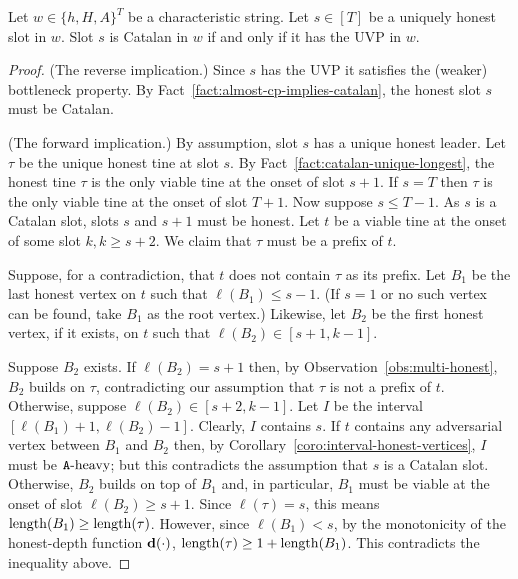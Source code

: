   \begin{theorem}\label{thm:unique-honest}
    Let $w \in \{h,H,A\}^T$ be a characteristic string. 
    Let $s \in [T]$ be a uniquely honest slot in $w$. 
    Slot $s$ is Catalan in $w$ 
    if and only if 
    it has the UVP in $w$. 
  \end{theorem}

  \begin{proof}
    (The reverse implication.) 
    Since $s$ has the UVP  
    it satisfies the (weaker) bottleneck property. 
    By Fact~\ref{fact:almost-cp-implies-catalan}, 
    the honest slot $s$ must be Catalan. 

    (The forward implication.) 
    By assumption, slot $s$ has a unique honest leader. 
    Let $\tau$ be the unique honest tine at slot $s$.
    By Fact~\ref{fact:catalan-unique-longest}, 
    the honest tine $\tau$ is the only viable tine 
    at the onset of slot $s + 1$.    
    If $s = T$ then $\tau$ is the only viable tine 
    at the onset of slot $T + 1$.
    Now suppose $s \leq T - 1$.
    As $s$ is a Catalan slot, slots $s$ and $s + 1$ must be honest. 
    Let $t$ be a viable tine at the onset of some slot $k, k \geq s + 2$. 
    We claim that $\tau$ must be a prefix of $t$. 

    Suppose, for a contradiction, that $t$ does not contain $\tau$ as
    its prefix.  Let $B_1$ be the last honest vertex on $t$ such that
    $\ell(B_1) \leq s - 1$.  (If $s = 1$ or no such vertex can be
    found, take $B_1$ as the root vertex.)  Likewise, let $B_2$ be the
    first honest vertex, if it exists, on $t$ such that
    $\ell(B_2) \in [s + 1, k - 1]$.


    Suppose $B_2$ exists.  If $\ell(B_2) = s + 1$ then, by
    Observation~\ref{obs:multi-honest}, $B_2$ builds on $\tau$,
    contradicting our assumption that $\tau$ is not a prefix of $t$.
    Otherwise, suppose $\ell(B_2) \in [s + 2, k-1]$.  Let $I$ be the
    interval $[\ell(B_1) + 1, \ell(B_2) - 1]$.  Clearly, $I$ contains
    $s$.  If $t$ contains any adversarial vertex between $B_1$ and
    $B_2$ then, by Corollary~\ref{coro:interval-honest-vertices}, $I$
    must be $\mathtt{A}\text{-heavy}$; but this contradicts the assumption that $s$ is
    a Catalan slot.  Otherwise, $B_2$ builds on top of $B_1$ and, in
    particular, $B_1$ must be viable at the onset of slot
    $\ell(B_2) \geq s + 1$.  Since $\ell(\tau) = s$, this means
    $\operatorname{length}(B_1) \geq \operatorname{length}(\tau)$.  However, since
    $\ell(B_1) < s$, by the monotonicity of the honest-depth function
    $\mathbf{d}(\cdot)$, $\operatorname{length}(\tau) \geq 1 + \operatorname{length}(B_1)$.  This
    contradicts the inequality above.



\end{proof}
